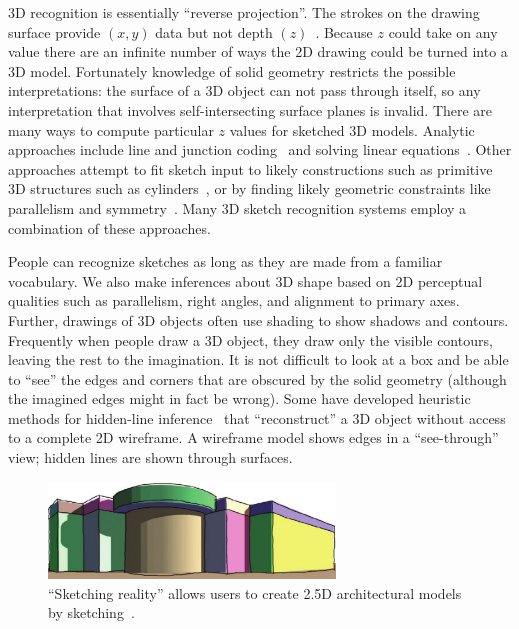 3D recognition is essentially ``reverse projection''. The strokes on
the drawing surface provide $(x,y)$ data but not depth
$(z)$~\cite{lipson-correlation}. Because $z$ could take on any value
there are an infinite number of ways the 2D drawing could be turned
into a 3D model. Fortunately knowledge of solid geometry restricts the
possible interpretations: the surface of a 3D object can not pass
through itself, so any interpretation that involves self-intersecting
surface planes is invalid. There are many ways to compute particular
$z$ values for sketched 3D models. Analytic approaches include line
and junction coding~\cite{clowes-seeing-things,huffman-nonsense} and
solving linear equations~\cite{grimstead-3d-linear-system}. Other
approaches attempt to fit sketch input to likely constructions such as
primitive 3D structures such as cylinders~\cite{wang-3d-sketch}, or by
finding likely geometric constraints like parallelism and
symmetry~\cite{shpitalni-curve-fitting}. Many 3D sketch recognition
systems employ a combination of these approaches.

People can recognize sketches as long as they are made from a familiar
vocabulary. We also make inferences about 3D shape based on 2D
perceptual qualities such as parallelism, right angles, and alignment
to primary axes. Further, drawings of 3D objects often use shading to
show shadows and contours. Frequently when people draw a 3D object,
they draw only the visible contours, leaving the rest to the
imagination. It is not difficult to look at a box and be able to
``see'' the edges and corners that are obscured by the solid geometry
(although the imagined edges might in fact be wrong). Some have
developed heuristic methods for hidden-line
inference~\cite{mumford-hidden-line,karpenko-smoothsketch} that
``reconstruct'' a 3D object without access to a complete 2D
wireframe. A wireframe model shows edges in a ``see-through'' view;
hidden lines are shown through surfaces.

\begin{figure}
\begin{center}
  \includegraphics[width=3in]{img/sketching-reality.pdf} \caption{``Sketching
  reality'' allows users to create 2.5D architectural models by
  sketching~\cite{chen-sketching-reality}.}  \label{fig:sketching-reality}
\end{center}
\end{figure}

